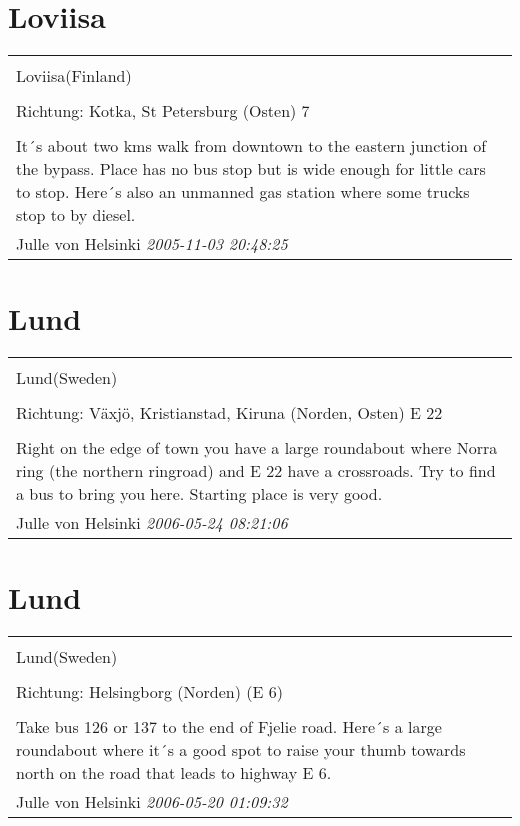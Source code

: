 \documentclass[a4paper,12pt]{article}
\begin{document}
\section{Loviisa}
\begin{tabular}{|p{13cm}|}
\hline\\
Loviisa(Finland)\\
\\
Richtung: Kotka, St Petersburg (Osten) 7 \\
\hline\\
It´s about two kms walk from downtown to the eastern junction of the bypass. Place has no bus stop but is wide enough for little cars to stop. Here´s also an unmanned gas station where some trucks stop to by diesel. \\
Julle von Helsinki \textit{ 2005-11-03 20:48:25 }\\\hline
\end{tabular}


\section{Lund}
\begin{tabular}{|p{13cm}|}
\hline\\
Lund(Sweden)\\
\\
Richtung: Växjö, Kristianstad, Kiruna (Norden, Osten) E 22 \\
\hline\\
Right on the edge of town you have a large roundabout where Norra ring (the northern ringroad) and E 22 have a crossroads. Try to find a bus to bring you here. Starting place is very good. \\
Julle von Helsinki \textit{ 2006-05-24 08:21:06 }\\\hline
\end{tabular}


\section{Lund}
\begin{tabular}{|p{13cm}|}
\hline\\
Lund(Sweden)\\
\\
Richtung: Helsingborg (Norden) (E 6) \\
\hline\\
Take bus 126 or 137 to the end of Fjelie road. Here´s a large roundabout where it´s a good spot to raise your thumb towards north on the road that leads to highway E 6. \\
Julle von Helsinki \textit{ 2006-05-20 01:09:32 }\\\hline
\end{tabular}
\end{document}
